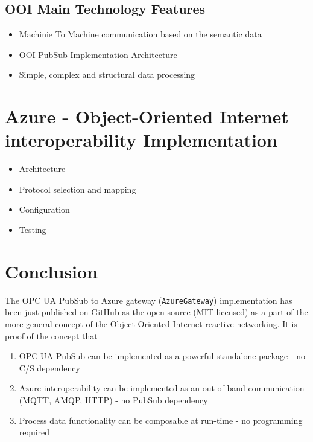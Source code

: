 \documentclass{jacsart}
\providecommand{\tightlist} { \setlength{\itemsep}{0pt}\setlength{\parskip}{0pt}}
\begin{document}
\subsection{OOI Main Technology Features}\label{ooi-main-technology-features}

\begin{itemize}
      \tightlist
      \item Machinie To Machine communication based on the semantic data
      \item OOI PubSub Implementation Architecture
      \item Simple, complex and structural data processing
\end{itemize}


\section{Azure - Object-Oriented Internet interoperability Implementation}\label{gateway-implementation}




\begin{itemize}
      \tightlist
      \item
            Architecture
      \item
            Protocol selection and mapping
      \item
            Configuration
      \item
            Testing
\end{itemize}

\section{Conclusion}\label{conclusion}

The OPC UA PubSub to Azure gateway (\texttt{AzureGateway})
implementation has been just published on GitHub as the open-source (MIT
licensed) as a part of the more general concept of the Object-Oriented
Internet reactive networking. It is proof of the concept that

\begin{enumerate}
      \def\labelenumi{\arabic{enumi}.}
      \tightlist
      \item
            OPC UA PubSub can be implemented as a powerful standalone package - no C/S dependency
      \item
            Azure interoperability can be implemented as an out-of-band
            communication (MQTT, AMQP, HTTP) - no PubSub dependency
      \item
            Process data functionality can be composable at run-time - no
            programming required
\end{enumerate}



\end{document}
